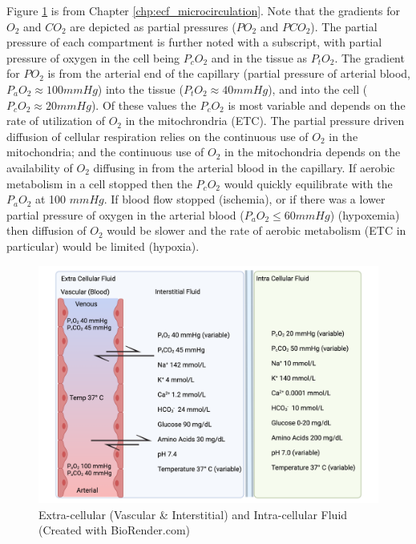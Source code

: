 Figure \ref{fig:ecf_respiration} is from Chapter \ref{chp:ecf_microcirculation}. Note that the gradients for $O_2$ and $CO_2$ are depicted as partial pressures ($PO_2$ and $PCO_2$). The partial pressure of each compartment is further noted with a subscript, with partial pressure of oxygen in the cell being $P_cO_2$ and in the tissue as $P_tO_2$. The gradient for $PO_2$ is from the arterial end of the capillary (partial pressure of arterial blood, $P_aO_2 \approx 100 mmHg$) into the tissue ($P_tO_2 \approx 40 mmHg$), and into the cell ($P_cO_2 \approx 20 mmHg$). Of these values the $P_cO_2$ is most variable and depends on the rate of utilization of $O_2$ in the mitochrondria (ETC). The partial pressure driven diffusion of cellular respiration relies on the continuous use of $O_2$ in the mitochondria; and the continuous use of $O_2$ in the mitochondria depends on the availability of $O_2$ diffusing in from the arterial blood in the capillary. If aerobic metabolism in a cell stopped then the $P_cO_2$ would quickly equilibrate with the $P_aO_2$ at 100 $mmHg$. If blood flow stopped (ischemia), or if there was a lower partial pressure of oxygen in the arterial blood ($P_aO_2 \leq 60 mmHg$) (hypoxemia) then diffusion of $O_2$ would be slower and the rate of aerobic metabolism (ETC in particular) would be limited (hypoxia).

\begin{figure}[!h]
    \centering
    \includegraphics[width=1.0\linewidth]{./figure/ecf.png}
    \caption{Extra-cellular (Vascular \& Interstitial) and Intra-cellular Fluid \footnotesize{(Created with BioRender.com)}}
    \label{fig:ecf_respiration}
\end{figure}


